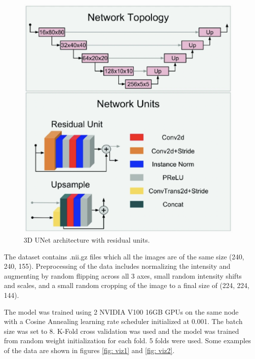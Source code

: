 \documentclass[10pt,twocolumn,letterpaper]{article}
\begin{document}
\begin{figure}[h]
   \begin{center}
      \includegraphics[width=0.95\linewidth]{images/network-arch.png}
   \end{center}
   \caption{3D UNet architecture with residual units.}
   \label{fig:arch}
\end{figure}

The dataset contains .nii.gz files which all the images are of the same size (240, 240, 155). Preprocessing of the data includes normalizing the intensity and augmenting by random flipping across all 3 axes, small random intensity shifts and scales, and a small random cropping of the image to a final size of (224, 224, 144).

The model was trained using 2 NVIDIA V100 16GB GPUs on the same node with a Cosine Annealing learning rate scheduler initialized at 0.001. The batch size was set to 8. K-Fold cross validation was used and the model was trained from random weight initialization for each fold. 5 folds were used. Some examples of the data are shown in figures \ref{fig: viz1} and \ref{fig: viz2}.
\end{document}
